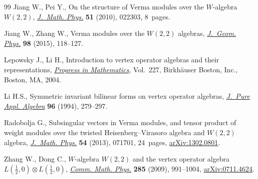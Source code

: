 \documentclass[11pt]{article}
\numberwithin{equation}{section}
\begin{document}
\begin{thebibliography}{99}
Jiang W., Pei Y., On the structure of {V}erma modules over the {$W$}-algebra
 {$W(2,2)$}, \href{http://dx.doi.org/10.1063/1.3290646}{\textit{J.~Math. Phys.}} \textbf{51} (2010), 022303, 8~pages.

Jiang W., Zhang W., Verma modules over the {$W(2,2)$} algebras,
 \href{http://dx.doi.org/10.1016/j.geomphys.2015.07.029}{\textit{J.~Geom. Phys.}} \textbf{98} (2015), 118--127.

Lepowsky J., Li H., Introduction to vertex operator algebras and their
 representations, \href{http://dx.doi.org/10.1007/978-0-8176-8186-9}{\textit{Progress in Mathematics}}, Vol.~227, Birkh\"auser
 Boston, Inc., Boston, MA, 2004.

Li H.S., Symmetric invariant bilinear forms on vertex operator algebras,
 \href{http://dx.doi.org/10.1016/0022-4049(94)90104-X}{\textit{J.~Pure Appl. Algebra}} \textbf{96} (1994), 279--297.

Radobolja G., Subsingular vectors in {V}erma modules, and tensor product of
 weight modules over the twisted {H}eisenberg--{V}irasoro algebra and
 {$W(2,2)$} algebra, \href{http://dx.doi.org/10.1063/1.4813439}{\textit{J.~Math. Phys.}} \textbf{54} (2013), 071701,
 24~pages, \href{http://arxiv.org/abs/1302.0801}{arXiv:1302.0801}.

Zhang W., Dong C., {$W$}-algebra {$W(2,2)$} and the vertex operator algebra
 {$L(\frac 12,0)\otimes L(\frac 12,0)$}, \href{http://dx.doi.org/10.1007/s00220-008-0562-x}{\textit{Comm. Math. Phys.}}
 \textbf{285} (2009), 991--1004, \href{http://arxiv.org/abs/0711.4624}{arXiv:0711.4624}.

\end{thebibliography}
\end{document}
